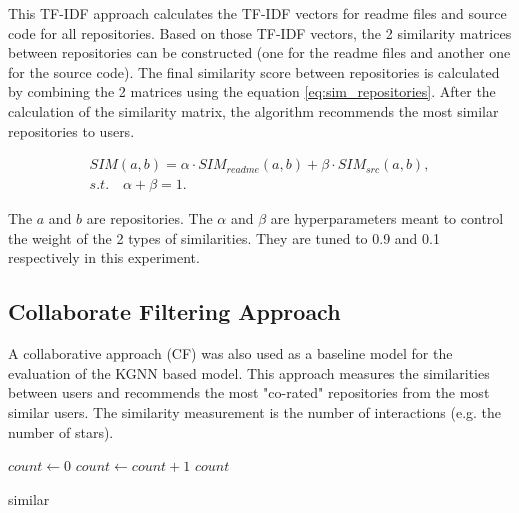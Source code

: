 \documentclass[11pt,twoside]{report}
\begin{document}
This TF-IDF approach calculates the TF-IDF vectors for readme files and source code for all repositories. Based on those TF-IDF vectors, the 2 similarity matrices between repositories can be constructed (one for the readme files and another one for the source code). The final similarity score between repositories is calculated by combining the 2 matrices using the equation \ref{eq:sim_repositories}. After the calculation of the similarity matrix, the algorithm recommends the most similar repositories to users.

\begin{gather}
    SIM(a,b)=\alpha\cdot{SIM_{readme}(a,b)}+\beta\cdot{SIM_{src}(a,b)}, \\
    s.t.\quad\alpha+\beta=1.
    \label{eq:sim_repositories}
\end{gather}

The $a$ and $b$ are repositories. The $\alpha$ and $\beta$ are hyperparameters meant to control the weight of the 2 types of similarities. They are tuned to 0.9 and 0.1 respectively in this experiment.

\subsection{Collaborate Filtering Approach}
A collaborative approach \cite{guendouz_recommending_2015} (CF) was also used as a baseline model for the evaluation of the KGNN based model. This approach measures the similarities between users and recommends the most "co-rated" repositories from the most similar users. The similarity measurement is the number of interactions (e.g. the number of stars).

\begin{algorithm}[H]
    \DontPrintSemicolon
    

    $count \leftarrow 0$ \newline
    {
        {
            $count \leftarrow count + 1$
        }
    }
    \Return $count$
    
    \caption{similar}
    \label{alg:similar}
\end{algorithm}
\end{document}
